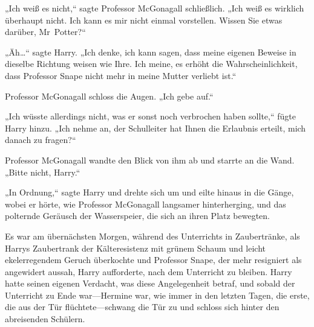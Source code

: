 „Ich weiß es nicht,“ sagte Professor McGonagall schließlich. „Ich weiß es wirklich überhaupt nicht. Ich kann es mir nicht einmal vorstellen. Wissen Sie etwas darüber, Mr~Potter?“

„Äh…“ sagte Harry. „Ich denke, ich kann sagen, dass meine eigenen Beweise in dieselbe Richtung weisen wie Ihre. Ich meine, es erhöht die Wahrscheinlichkeit, dass Professor Snape nicht mehr in meine Mutter verliebt ist.“

Professor McGonagall schloss die Augen. „Ich gebe auf.“

„Ich wüsste allerdings nicht, was er sonst noch verbrochen haben sollte,“ fügte Harry hinzu. „Ich nehme an, der Schulleiter hat Ihnen die Erlaubnis erteilt, mich danach zu fragen?“

Professor McGonagall wandte den Blick von ihm ab und starrte an die Wand. „Bitte nicht, Harry.“

„In Ordnung,“ sagte Harry und drehte sich um und eilte hinaus in die Gänge, wobei er hörte, wie Professor McGonagall langsamer hinterherging, und das polternde Geräusch der Wasserspeier, die sich an ihren Platz bewegten.

\later

Es war am übernächsten Morgen, während des Unterrichts in Zaubertränke, als Harrys Zaubertrank der Kälteresistenz mit grünem Schaum und leicht ekelerregendem Geruch überkochte und Professor Snape, der mehr resigniert als angewidert aussah, Harry aufforderte, nach dem Unterricht zu bleiben. Harry hatte seinen eigenen Verdacht, was diese Angelegenheit betraf, und sobald der Unterricht zu Ende war—Hermine war, wie immer in den letzten Tagen, die erste, die aus der Tür flüchtete—schwang die Tür zu und schloss sich hinter den abreisenden Schülern.


